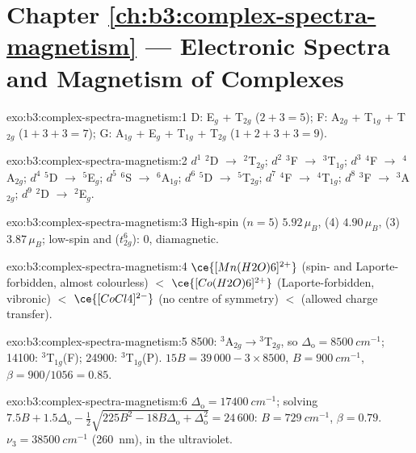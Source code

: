 \section*{Chapter \ref{ch:b3:complex-spectra-magnetism} --- Electronic Spectra and Magnetism of Complexes}

\begin{solution}{exo:b3:complex-spectra-magnetism:1}
D: E$_g$ + T$_{2g}$ ($2 + 3 = 5$); F: A$_{2g}$ + T$_{1g}$ + T$_{2g}$ ($1 + 3 + 3 = 7$); G: A$_{1g}$ + E$_g$ + T$_{1g}$ + T$_{2g}$
($1 + 2 + 3 + 3 = 9$).
\end{solution}

\begin{solution}{exo:b3:complex-spectra-magnetism:2}
$d^1$ $^2$D $\to$ $^2$T$_{2g}$; $d^2$ $^3$F $\to$ $^3$T$_{1g}$; $d^3$ $^4$F $\to$ $^4$A$_{2g}$; $d^4$ $^5$D $\to$ $^5$E$_g$; $d^5$ $^6$S $\to$ $^6$A$_{1g}$; $d^6$ $^5$D
$\to$ $^5$T$_{2g}$; $d^7$ $^4$F $\to$ $^4$T$_{1g}$; $d^8$ $^3$F $\to$ $^3$A$_{2g}$; $d^9$ $^2$D $\to$ $^2$E$_g$.
\end{solution}

\begin{solution}{exo:b3:complex-spectra-magnetism:3}
High-spin  ($n = 5$) $5.92\,\mu_B$,  (4) $4.90\,\mu_B$,  (3) $3.87\,\mu_B$; low-spin  and
 ($t_{2g}^6$): 0, diamagnetic.
\end{solution}

\begin{solution}{exo:b3:complex-spectra-magnetism:4}
$\ce{[Mn(H2O)6]^{2+}}$ (spin- and Laporte-forbidden, almost colourless) $<$ $\ce{[Co(H2O)6]^{2+}}$
(Laporte-forbidden, vibronic) $<$ $\ce{[CoCl4]^{2-}}$ (no centre of symmetry) $<$  (allowed
charge transfer).
\end{solution}

\begin{solution}{exo:b3:complex-spectra-magnetism:5}
8500: $^3$A$_{2g}\to{}^3$T$_{2g}$, so $\Delta_{\mathrm o} = \qty{8500}{cm^{-1}}$; 14100: $^3$T$_{1g}$(F); 24900: $^3$T$_{1g}$(P).
$15B = 39\,000 - 3 \times 8500$, $B = \qty{900}{cm^{-1}}$, $\beta = 900/1056 = 0.85$.
\end{solution}

\begin{solution}{exo:b3:complex-spectra-magnetism:6}
$\Delta_{\mathrm o} = \qty{17400}{cm^{-1}}$; solving $7.5B + 1.5\Delta_{\mathrm o} - \frac12\sqrt{225B^2 - 18B\Delta_{\mathrm o} + \Delta_{\mathrm o}^2} = 24\,600$: $B = \qty{729}{cm^{-1}}$,
$\beta = 0.79$. $\nu_3 = \qty{38500}{cm^{-1}}$ (\qty{260}{nm}), in the ultraviolet.
\end{solution}

